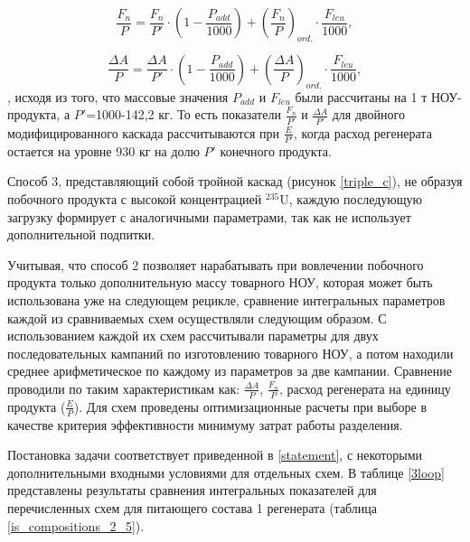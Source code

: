 \begin{equation} \label{Fnu_plus} 
    \frac{F_n}{P}=\frac{F_n}{P'}\cdot (1 - \frac{P_{add}}{1000}) + (\frac{F_n}{P})_{ord.}\cdot \frac{F_{leu}}{1000},
\end{equation} 

\begin{equation} \label{AvsP_plus} 
    \frac{\Delta A}{P}=\frac{\Delta A}{P'}\cdot (1 - \frac{P_{add}}{1000}) + (\frac{\Delta A}{P})_{ord.}\cdot \frac{F_{leu}}{1000},
\end{equation} 
, исходя из того, что массовые значения $P_{add}$ и $F_{leu}$ были рассчитаны на 1 т НОУ-продукта, а $P'$=1000-142,2 кг. То есть показатели $\frac{F_n}{P'}$ и
$\frac{\Delta A}{P'}$ для двойного модифицированного каскада рассчитываются при $\frac{E}{P'}$, когда расход регенерата остается на уровне 930 кг на долю $P'$ конечного продукта.

Способ 3, представляющий собой тройной каскад (рисунок \ref{triple_c}), не образуя побочного продукта с высокой концентрацией $^{235}$U, каждую последующую загрузку формирует с аналогичными параметрами, так как не использует дополнительной подпитки.

Учитывая, что способ 2 позволяет нарабатывать при вовлечении побочного продукта только дополнительную массу товарного НОУ, которая может быть использована уже на следующем рецикле, сравнение интегральных параметров каждой из сравниваемых схем осуществляли следующим образом. С использованием каждой их схем рассчитывали параметры для двух последовательных кампаний по изготовлению товарного НОУ, а потом находили среднее арифметическое по каждому из параметров за две кампании. Сравнение проводили по таким характеристикам как: $\frac{\Delta A}{P}$, $\frac{F_n}{P}$, расход регенерата на единицу продукта ($\frac{E}{P}$). Для схем проведены оптимизационные расчеты при выборе в качестве критерия эффективности минимуму затрат работы разделения.

Постановка задачи соответствует приведенной в \ref{statement}, с некоторыми дополнительными входными условиями для отдельных схем.
В таблице \ref{3loop} представлены результаты сравнения интегральных показателей для перечисленных схем для питающего состава 1 регенерата (таблица \ref{is_compositions_2_5}).

